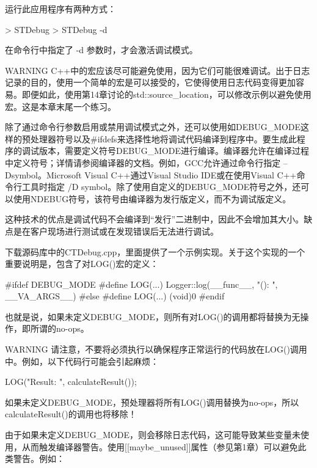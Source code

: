 运行此应用程序有两种方式：

\begin{shell}
> STDebug
> STDebug -d
\end{shell}

在命令行中指定了 -d 参数时，才会激活调试模式。

\begin{myWarning}{WARNING}
C++中的宏应该尽可能避免使用，因为它们可能很难调试。出于日志记录的目的，使用一个简单的宏是可以接受的，它使得使用日志代码变得更加容易。即便如此，使用第14章讨论的std::source\_location，可以修改示例以避免使用宏。这是本章末尾一个练习。
\end{myWarning}


除了通过命令行参数启用或禁用调试模式之外，还可以使用如DEBUG\_MODE这样的预处理器符号以及\#ifdefs来选择性地将调试代码编译到程序中。要生成此程序的调试版本，需要定义符号DEBUG\_MODE进行编译。编译器允许在编译过程中定义符号；详情请参阅编译器的文档。例如，GCC允许通过命令行指定 –Dsymbol。Microsoft Visual C++通过Visual Studio IDE或在使用Visual C++命令行工具时指定 /D symbol。除了使用自定义的DEBUG\_MODE符号之外，还可以使用NDEBUG符号，该符号由编译器为发行版定义，而不为调试版定义。

这种技术的优点是调试代码不会编译到“发行”二进制中，因此不会增加其大小。缺点是在客户现场进行测试或在发现错误后无法进行调试。

下载源码库中的CTDebug.cpp，里面提供了一个示例实现。关于这个实现的一个重要说明是，包含了对LOG()宏的定义：

\begin{cpp}
#ifdef DEBUG_MODE
    #define LOG(...) Logger::log(__func__, "(): ", __VA_ARGS__)
#else
    #define LOG(...) (void)0
#endif
\end{cpp}

也就是说，如果未定义DEBUG\_MODE，则所有对LOG()的调用都将替换为无操作，即所谓的no-ops。

\begin{myWarning}{WARNING}
请注意，不要将必须执行以确保程序正常运行的代码放在LOG()调用中。例如，以下代码行可能会引起麻烦：

\begin{cpp}
LOG("Result: ", calculateResult());
\end{cpp}

如果未定义DEBUG\_MODE，预处理器将所有LOG()调用替换为no-ops，所以calculateResult()的调用也将移除！
\end{myWarning}

由于如果未定义DEBUG\_MODE，则会移除日志代码，这可能导致某些变量未使用，从而触发编译器警告。使用[[maybe\_unused]]属性（参见第1章）可以避免此类警告。例如：

